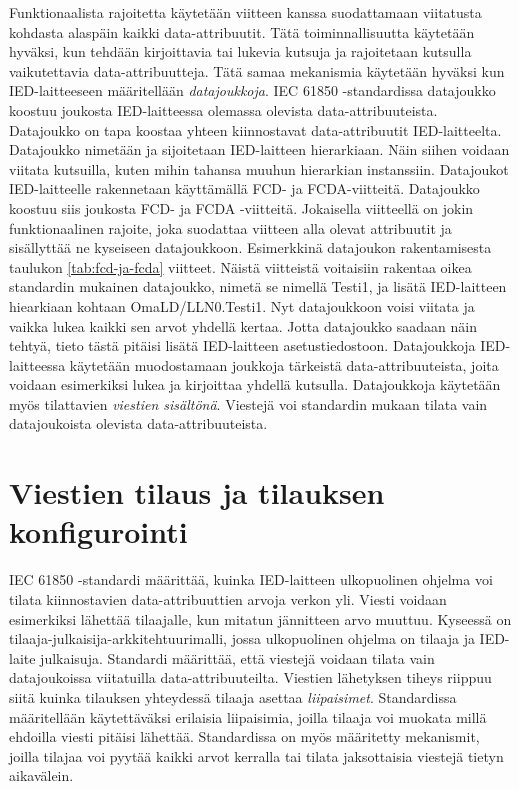 Funktionaalista rajoitetta käytetään viitteen kanssa suodattamaan viitatusta kohdasta alaspäin kaikki data-attribuutit. Tätä toiminnallisuutta käytetään hyväksi, kun tehdään kirjoittavia tai lukevia kutsuja ja rajoitetaan kutsulla vaikutettavia data-attribuutteja. Tätä samaa mekanismia käytetään hyväksi kun IED-laitteeseen määritellään \emph{datajoukkoja}. IEC 61850 -standardissa datajoukko koostuu joukosta IED-laitteessa olemassa olevista data-attribuuteista. Datajoukko on tapa koostaa yhteen kiinnostavat data-attribuutit IED-laitteelta. Datajoukko nimetään ja sijoitetaan IED-laitteen hierarkiaan. Näin siihen voidaan viitata kutsuilla, kuten mihin tahansa muuhun hierarkian instanssiin. Datajoukot IED-laitteelle rakennetaan käyttämällä FCD- ja FCDA-viitteitä. Datajoukko koostuu siis joukosta FCD- ja FCDA -viitteitä. Jokaisella viitteellä on jokin funktionaalinen rajoite, joka suodattaa viitteen alla olevat attribuutit ja sisällyttää ne kyseiseen datajoukkoon. Esimerkkinä datajoukon rakentamisesta taulukon \ref{tab:fcd-ja-fcda} viitteet. Näistä viitteistä voitaisiin rakentaa oikea standardin mukainen datajoukko, nimetä se nimellä Testi1, ja lisätä IED-laitteen hiearkiaan kohtaan OmaLD/LLN0.Testi1. Nyt datajoukkoon voisi viitata ja vaikka lukea kaikki sen arvot yhdellä kertaa. Jotta datajoukko saadaan näin tehtyä, tieto tästä pitäisi lisätä IED-laitteen asetustiedostoon. Datajoukkoja IED-laitteessa käytetään muodostamaan joukkoja tärkeistä data-attribuuteista, joita voidaan esimerkiksi lukea ja kirjoittaa yhdellä kutsulla. Datajoukkoja käytetään myös tilattavien \emph{viestien sisältönä}. Viestejä voi standardin mukaan tilata vain datajoukoista olevista data-attribuuteista. \mbox{\cite[s.~61--68]{IEC61850-7-2}}


\section{Viestien tilaus ja tilauksen konfigurointi}
\label{ch:viestien-tilaus-ja-tilauksen-konfigurointi}
IEC 61850 -standardi määrittää, kuinka IED-laitteen ulkopuolinen ohjelma voi tilata kiinnostavien data-attribuuttien arvoja verkon yli. Viesti voidaan esimerkiksi lähettää tilaajalle, kun mitatun jännitteen arvo muuttuu. Kyseessä on tilaaja-julkaisija-arkkitehtuurimalli, jossa ulkopuolinen ohjelma on tilaaja ja IED-laite julkaisuja. Standardi määrittää, että viestejä voidaan tilata vain datajoukoissa viitatuilla data-attribuuteilta. Viestien lähetyksen tiheys riippuu siitä kuinka tilauksen yhteydessä tilaaja asettaa \emph{liipaisimet}. Standardissa määritellään käytettäväksi erilaisia liipaisimia, joilla tilaaja voi muokata millä ehdoilla viesti pitäisi lähettää. Standardissa on myös määritetty mekanismit, joilla tilajaa voi pyytää kaikki arvot kerralla tai tilata jaksottaisia viestejä tietyn aikavälein. \mbox{\cite{IEC61850-7-1}}

